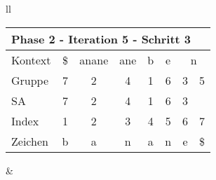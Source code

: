 \begin{table}[H]
\begin{adjustbox}{max width=\textwidth}
\begin{tabular}{ll}
\begin{tabular}{lccccccc}
\multicolumn{8}{l}{Phase 2 - Iteration 5 - Schritt 3}                                                                                                                                                                     \\ \hline
\multicolumn{1}{l|}{Kontext} & \multicolumn{1}{c|}{\$} & \multicolumn{1}{c|}{anane} & \multicolumn{1}{c|}{ane} & \multicolumn{1}{c|}{b} & \multicolumn{1}{c|}{\cellcolor[HTML]{\green}e} & \multicolumn{2}{c}{n}         \\
\multicolumn{1}{l|}{Gruppe}  & \multicolumn{1}{c|}{7}  & \multicolumn{1}{c|}{2}     & \multicolumn{1}{c|}{4}   & \multicolumn{1}{c|}{1} & \multicolumn{1}{c|}{\cellcolor[HTML]{\green}6} & 3                         & 5  \\ 
\multicolumn{1}{l|}{SA}      & \multicolumn{1}{c|}{7}  & \multicolumn{1}{c|}{2}     & \multicolumn{1}{c|}{4}   & \multicolumn{1}{c|}{1} & \multicolumn{1}{c|}{\cellcolor[HTML]{\green}6} & 3                         &    \\ \hline
\multicolumn{1}{l|}{Index}   & 1                       & 2                          & 3                        & 4                      & \cellcolor[HTML]{\blue}5                      & \cellcolor[HTML]{\green}6 & 7  \\
\multicolumn{1}{l|}{Zeichen} & b                       & a                          & n                        & a                      & \cellcolor[HTML]{\blue}n                      & \cellcolor[HTML]{\green}e & \$
\end{tabular}

&


\end{tabular}
\end{adjustbox}
\end{table}
